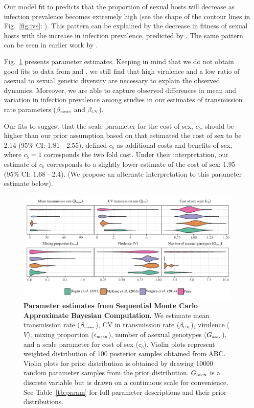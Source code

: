 \documentclass{article}\usepackage[]{graphicx}\usepackage[]{color}
\newcommand{\fref}[1]{Fig.~\ref{fig:#1}}
\begin{document}
Our model fit to \cite{vergara2014infection} predicts that the proportion of sexual hosts will decrease as infection prevalence becomes extremely high (see the shape of the contour lines in \fref{ivs}: \cite{vergara2014infection}).
This pattern can be explained by the decrease in fitness of sexual hosts with the increase in infection prevalence, predicted by \cite{ashby2015diversity}.
The same pattern can be seen in earlier work by \cite{lively2010epidemiological}.

\fref{smcparam} presents parameter estimates.
Keeping in mind that we do not obtain good fits to data from \cite{dagan2013clonal} and \cite{mckone2016fine}, we still find that high virulence and a low ratio of asexual to sexual genetic diversity are necessary to explain the observed dynamics.
Moreover, we are able to capture observed differences in mean and variation in infection prevalence among studies in our estimates of transmission rate parameters ($\beta_{\textrm{\tiny mean}}$ and $\beta_{\textrm{\tiny CV}}$).

Our fits to \cite{mckone2016fine} suggest that the scale parameter for the cost of sex, $c_b$, should be higher than our prior assumption based on \cite{gibson2017two} that estimated the cost of sex to be 2.14 (95\% CI: 1.81 - 2.55).
\cite{ashby2015diversity} defined $c_b$ as additional costs and benefits of sex, where $c_b=1$ corresponds the two fold cost.
Under their interpretation, our estimate of $c_b$ corresponds to a slightly lower estimate of the cost of sex: 1.95 (95\% CI: 1.68 - 2.4). 
(We propose an alternate interpretation to this parameter estimate below).

\begin{figure}[!ht]
\includegraphics[width=\textwidth]{../fig/posterior.pdf}
\caption{{\bf Parameter estimates from Sequential Monte Carlo Approximate Bayesian Computation.}
We estimate mean transmission rate ($\beta_{\textrm{\tiny mean}}$), CV in transmission rate ($\beta_{\textrm{\tiny CV}}$), virulence ($V$), mixing proportion ($\epsilon_{\textrm{\tiny mean}}$), number of asexual genotypes ($G_{\textrm{\tiny asex}}$), and a scale parameter for cost of sex ($c_b$).
Violin plots represent weighted distribution of 100 posterior samples obtained from ABC.
Violin plots for prior distribution is obtained by drawing 10000 random parameter samples from the prior distribution.
$G_{\tiny \textrm{asex}}$ is a discrete variable but is drawn on a continuous scale for convenience.
See Table~\ref{tb:param} for full parameter descriptions and their prior distributions.
}
\label{fig:smcparam}
\end{figure}
\end{document}
